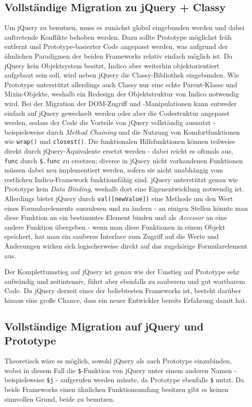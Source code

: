 \subsection{Vollständige Migration zu jQuery + Classy}
Um jQuery zu benutzen, muss es zunächst global eingebunden werden und dabei auftretende Konflikte
behoben werden. Dazu sollte Prototype möglichst früh entfernt und Prototype-basierter Code angepasst
werden, was aufgrund der ähnlichen Paradigmen der beiden Frameworks relativ einfach möglich ist.
Da jQuery kein Objektsystem besitzt, Indico aber weiterhin objektorientiert aufgebaut sein soll,
wird neben jQuery die Classy-Bibliothek eingebunden. Wie Prototype unterstützt allerdings auch
Classy nur eine echte Parent-Klasse und Mixin-Objekte, weshalb ein Redesign der Objektstruktur von
Indico notwendig wird. Bei der Migration der DOM-Zugriff und -Manipulationen kann entweder einfach
auf jQuery gewechselt werden oder aber die Codestruktur angepasst werden, sodass der Code die
Vorteile von jQuery vollständig ausnutzt - beispielsweise durch \emph{Method Chaining} und die
Nutzung von Komfortfunktionen wie \lstinline{wrap()} und \lstinline{closest()}. Die funktionalen
Hilfsfunktionen können teilweise direkt durch jQuery-Äquivalente ersetzt werden - dabei reicht es
oftmals aus, \lstinline{func} durch \lstinline{$.func} zu ersetzen; diverse in jQuery nicht
vorhandenen Funktionen müssen dabei neu implementiert werden, sofern sie nicht unabhängig vom
restlichen Indico-Framework funktionsfähig sind. jQuery unterstützt genau wie Prototype kein
\emph{Data Binding}, weshalb dort eine Eigenentwicklung notwendig ist. Allerdings bietet jQuery
durch \lstinline{val([newValue])} eine Methode um den Wert eines Formularelements auszulesen und zu
ändern - an einigen Stellen könnte man diese Funktion an ein bestimmtes Element binden und als
\emph{Accessor} an eine andere Funktion übergeben - wenn man diese Funktionen in einem Objekt
speichert, hat man ein sauberes Interface zum Zugriff auf die Werte und Änderungen wirken sich
logischerweise direkt auf das zugehörige Formularelement aus.

Der Komplettumstieg auf jQuery ist genau wie der Umstieg auf Prototype sehr aufwändig und
zeitintensiv, führt aber ebenfalls zu sauberem und gut wartbarem Code. Da jQuery derzeit eines der
beliebtesten Frameworks ist, besteht darüber hinaus eine große Chance, dass ein neuer Entwickler
bereits Erfahrung damit hat.


\subsection{Vollständige Migration auf jQuery und Prototype}
Theoretisch wäre es möglich, sowohl jQuery als auch Prototype einzubinden, wobei in diesem Fall die
\lstinline{$}-Funktion von jQuery unter einem anderen Namen - beispielsweise \lstinline{$j} -
aufgerufen werden müsste, da Prototype ebenfalls \lstinline{$} nutzt. Da beide Frameworks einen
ähnlichen Funktionsumfang besitzen gibt es keinen sinnvollen Grund, beide zu benutzen.


